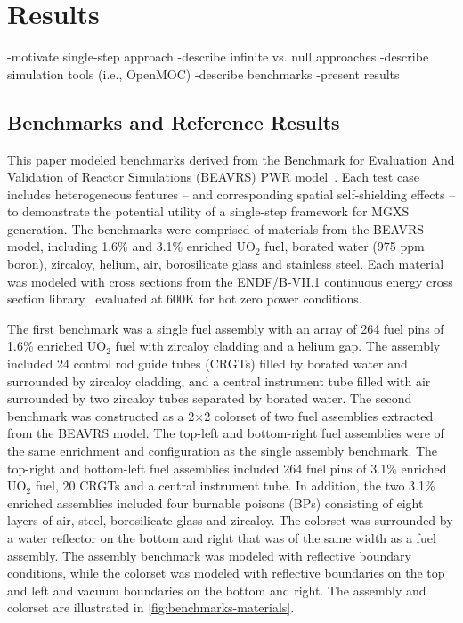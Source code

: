 \section{Results}
\label{sec:results}

-motivate single-step approach
-describe infinite vs. null approaches
-describe simulation tools (i.e., OpenMOC)
-describe benchmarks
-present results




\subsection{Benchmarks and Reference Results}
\label{subsec:benchmarks}

This paper modeled benchmarks derived from the Benchmark for Evaluation And Validation of Reactor Simulations (BEAVRS) PWR model~\cite{horelik2013beavrs}. Each test case includes heterogeneous features -- and corresponding spatial self-shielding effects -- to demonstrate the potential utility of a single-step framework for MGXS generation. The benchmarks were comprised of materials from the BEAVRS model, including 1.6\% and 3.1\% enriched UO$_2$ fuel, borated water (975 ppm boron), zircaloy, helium, air, borosilicate glass and stainless steel. Each material was modeled with cross sections from the ENDF/B-VII.1 continuous energy cross section library~\cite{mcnpx2003manual} evaluated at 600K for hot zero power conditions. 


The first benchmark was a single fuel assembly with an array of 264 fuel pins of 1.6\% enriched UO$_2$ fuel with zircaloy cladding and a helium gap. The assembly included 24 control rod guide tubes (CRGTs) filled by borated water and surrounded by zircaloy cladding, and a central instrument tube filled with air surrounded by two zircaloy tubes separated by borated water. The second benchmark was constructed as a 2$\times$2 colorset of two fuel assemblies extracted from the BEAVRS model. The top-left and bottom-right fuel assemblies were of the same enrichment and configuration as the single assembly benchmark. The top-right and bottom-left fuel assemblies included 264 fuel pins of 3.1\% enriched UO$_2$ fuel, 20 CRGTs and a central instrument tube. In addition, the two 3.1\% enriched assemblies included four burnable poisons (BPs) consisting of eight layers of air, steel, borosilicate glass and zircaloy. The colorset was surrounded by a water reflector on the bottom and right that was of the same width as a fuel assembly. The assembly benchmark was modeled with reflective boundary conditions, while the colorset was modeled with reflective boundaries on the top and left and vacuum boundaries on the bottom and right. The assembly and colorset are illustrated in \autoref{fig:benchmarks-materials}.

